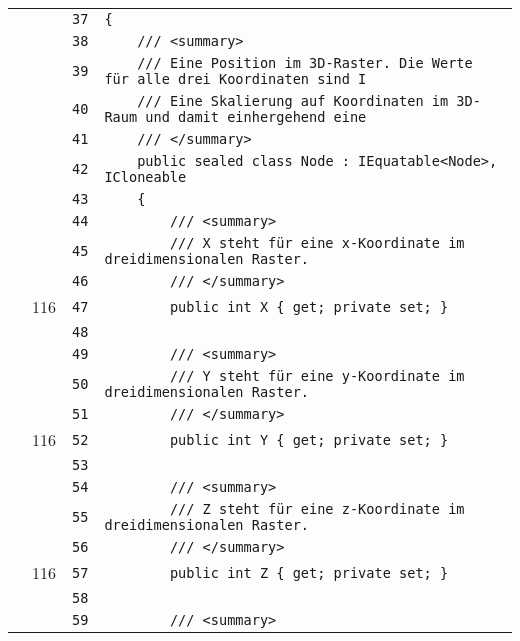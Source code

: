 \documentclass[a4paper,10pt]{article}
\begin{document}
\begin{longtable}[l]{lrrl}
\cellcolor{gray} &  & \verb~37~ & \verb~{~\\
\cellcolor{gray} &  & \verb~38~ & \verb~    /// <summary>~\\
\cellcolor{gray} &  & \verb~39~ & \verb~    /// Eine Position im 3D-Raster. Die Werte für alle drei Koordinaten sind I~\\
\cellcolor{gray} &  & \verb~40~ & \verb~    /// Eine Skalierung auf Koordinaten im 3D-Raum und damit einhergehend eine~\\
\cellcolor{gray} &  & \verb~41~ & \verb~    /// </summary>~\\
\cellcolor{gray} &  & \verb~42~ & \verb~    public sealed class Node : IEquatable<Node>, ICloneable~\\
\cellcolor{gray} &  & \verb~43~ & \verb~    {~\\
\cellcolor{gray} &  & \verb~44~ & \verb~        /// <summary>~\\
\cellcolor{gray} &  & \verb~45~ & \verb~        /// X steht für eine x-Koordinate im dreidimensionalen Raster.~\\
\cellcolor{gray} &  & \verb~46~ & \verb~        /// </summary>~\\
\cellcolor{green} & 116 & \verb~47~ & \verb~        public int X { get; private set; }~\\
\cellcolor{gray} &  & \verb~48~ & \verb~~\\
\cellcolor{gray} &  & \verb~49~ & \verb~        /// <summary>~\\
\cellcolor{gray} &  & \verb~50~ & \verb~        /// Y steht für eine y-Koordinate im dreidimensionalen Raster.~\\
\cellcolor{gray} &  & \verb~51~ & \verb~        /// </summary>~\\
\cellcolor{green} & 116 & \verb~52~ & \verb~        public int Y { get; private set; }~\\
\cellcolor{gray} &  & \verb~53~ & \verb~~\\
\cellcolor{gray} &  & \verb~54~ & \verb~        /// <summary>~\\
\cellcolor{gray} &  & \verb~55~ & \verb~        /// Z steht für eine z-Koordinate im dreidimensionalen Raster.~\\
\cellcolor{gray} &  & \verb~56~ & \verb~        /// </summary>~\\
\cellcolor{green} & 116 & \verb~57~ & \verb~        public int Z { get; private set; }~\\
\cellcolor{gray} &  & \verb~58~ & \verb~~\\
\cellcolor{gray} &  & \verb~59~ & \verb~        /// <summary>~\\

\end{longtable}
\end{document}

